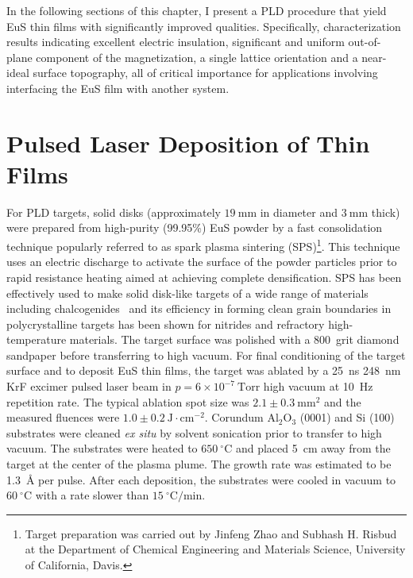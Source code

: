 In the following sections of this chapter, I present a PLD procedure that yield EuS thin films with significantly improved qualities. Specifically, characterization results indicating excellent electric insulation, significant and uniform out-of-plane component of the magnetization, a single lattice orientation and a near-ideal surface topography, all of critical importance for applications involving interfacing the EuS film with another system.

\section{Pulsed Laser Deposition of Thin Films}
For PLD targets, solid disks (approximately $19~\mathrm{mm}$ in diameter and $3~\mathrm{mm}$ thick) were prepared from high-purity (99.95\%) EuS powder by a fast consolidation technique popularly referred to as spark plasma sintering (SPS)\footnote{Target preparation was carried out by Jinfeng Zhao and Subhash H. Risbud at the Department of Chemical Engineering and Materials Science, University of California, Davis.}. This technique uses an electric discharge to activate the surface of the powder particles prior to rapid resistance heating aimed at achieving complete densification. SPS has been effectively used to make solid disk-like targets of a wide range of materials including chalcogenides~\cite{Jinfeng2, Subhash1} and its efficiency in forming clean grain boundaries in polycrystalline targets has been shown for nitrides and refractory high-temperature materials.\cite{Subhash2, Jinfeng1} The target surface was polished with a 800~grit diamond sandpaper before transferring to high vacuum. For final conditioning of the target surface and to deposit EuS thin films, the target was ablated by a 25~ns 248~nm KrF excimer pulsed laser beam in $p=6\times{}10^{-7}~\mathrm{Torr}$ high vacuum at 10~Hz repetition rate. The typical ablation spot size was $2.1\pm0.3~\mathrm{mm^2}$ and the measured fluences were $1.0\pm0.2~\mathrm{J\cdot{}cm^{-2}}$. Corundum Al$_2$O$_3$ (0001) and Si (100) substrates were cleaned \textit{ex situ} by solvent sonication prior to transfer to high vacuum. The substrates were heated to $650~^{\circ}\mathrm{C}$ and placed 5~cm away from the target at the center of the plasma plume. The growth rate was estimated to be 1.3~\AA{} per pulse. After each deposition, the substrates were cooled in vacuum to $60~^{\circ}\mathrm{C}$ with a rate slower than $15~^{\circ}\mathrm{C}/\mathrm{min}$.

